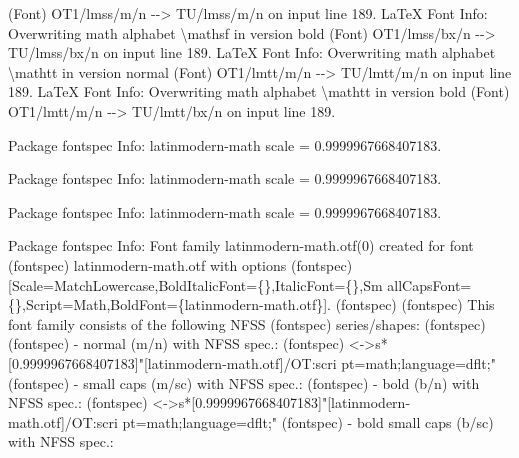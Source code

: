 \documentclass[
  letterpaper,
  DIV=11,
  numbers=noendperiod]{scrartcl}
\newenvironment{Shaded}{\begin{snugshade}}{\end{snugshade}}
\newcommand{\NormalTok}[1]{\textcolor[rgb]{0.00,0.23,0.31}{#1}}
\begin{document}
\begin{Shaded}
\begin{Highlighting}[]
\NormalTok{(Font)                  OT1/lmss/m/n {-}{-}\textgreater{} TU/lmss/m/n on input line 189.}
\NormalTok{LaTeX Font Info:    Overwriting math alphabet \textasciigrave{}\textbackslash{}mathsf\textquotesingle{} in version \textasciigrave{}bold\textquotesingle{}}
\NormalTok{(Font)                  OT1/lmss/bx/n {-}{-}\textgreater{} TU/lmss/bx/n on input line 189.}
\NormalTok{LaTeX Font Info:    Overwriting math alphabet \textasciigrave{}\textbackslash{}mathtt\textquotesingle{} in version \textasciigrave{}normal\textquotesingle{}}
\NormalTok{(Font)                  OT1/lmtt/m/n {-}{-}\textgreater{} TU/lmtt/m/n on input line 189.}
\NormalTok{LaTeX Font Info:    Overwriting math alphabet \textasciigrave{}\textbackslash{}mathtt\textquotesingle{} in version \textasciigrave{}bold\textquotesingle{}}
\NormalTok{(Font)                  OT1/lmtt/m/n {-}{-}\textgreater{} TU/lmtt/bx/n on input line 189.}

\NormalTok{Package fontspec Info: latinmodern{-}math scale = 0.9999967668407183.}


\NormalTok{Package fontspec Info: latinmodern{-}math scale = 0.9999967668407183.}


\NormalTok{Package fontspec Info: latinmodern{-}math scale = 0.9999967668407183.}


\NormalTok{Package fontspec Info: Font family \textquotesingle{}latinmodern{-}math.otf(0)\textquotesingle{} created for font}
\NormalTok{(fontspec)             \textquotesingle{}latinmodern{-}math.otf\textquotesingle{} with options}
\NormalTok{(fontspec)             [Scale=MatchLowercase,BoldItalicFont=\{\},ItalicFont=\{\},Sm}
\NormalTok{allCapsFont=\{\},Script=Math,BoldFont=\{latinmodern{-}math.otf\}].}
\NormalTok{(fontspec)              }
\NormalTok{(fontspec)              This font family consists of the following NFSS}
\NormalTok{(fontspec)             series/shapes:}
\NormalTok{(fontspec)              }
\NormalTok{(fontspec)             {-} \textquotesingle{}normal\textquotesingle{} (m/n) with NFSS spec.:}
\NormalTok{(fontspec)             \textless{}{-}\textgreater{}s*[0.9999967668407183]"[latinmodern{-}math.otf]/OT:scri}
\NormalTok{pt=math;language=dflt;"}
\NormalTok{(fontspec)             {-} \textquotesingle{}small caps\textquotesingle{}  (m/sc) with NFSS spec.: }
\NormalTok{(fontspec)             {-} \textquotesingle{}bold\textquotesingle{} (b/n) with NFSS spec.:}
\NormalTok{(fontspec)             \textless{}{-}\textgreater{}s*[0.9999967668407183]"[latinmodern{-}math.otf]/OT:scri}
\NormalTok{pt=math;language=dflt;"}
\NormalTok{(fontspec)             {-} \textquotesingle{}bold small caps\textquotesingle{}  (b/sc) with NFSS spec.: }


\end{Highlighting}
\end{Shaded}
\end{document}
